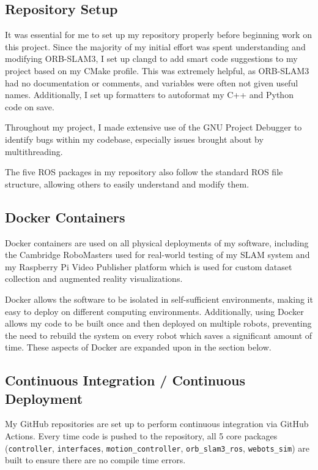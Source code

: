 \subsection{Repository Setup}
\label{sec:repository-setup}
It was essential for me to set up my repository properly before beginning work on this project. Since the majority of my initial effort was spent understanding and modifying ORB-SLAM3, I set up clangd to add smart code suggestions to my project based on my CMake profile. This was extremely helpful, as ORB-SLAM3 had no documentation or comments, and variables were often not given useful names. Additionally, I set up formatters to autoformat my C++ and Python code on save.

Throughout my project, I made extensive use of the GNU Project Debugger to identify bugs within my codebase, especially issues brought about by multithreading.

The five ROS packages in my repository also follow the standard ROS file structure, allowing others to easily understand and modify them.

\subsection{Docker Containers}
\label{sec:docker-containers}
Docker containers are used on all physical deployments of my software, including the Cambridge RoboMasters used for real-world testing of my SLAM system and my Raspberry Pi Video Publisher platform which is used for custom dataset collection and augmented reality visualizations.

Docker allows the software to be isolated in self-sufficient environments, making it easy to deploy on different computing environments. Additionally, using Docker allows my code to be built once and then deployed on multiple robots, preventing the need to rebuild the system on every robot which saves a significant amount of time. These aspects of Docker are expanded upon in the section below.

\subsection{Continuous Integration / Continuous Deployment}
\label{sec:cicd}
My GitHub repositories are set up to perform continuous integration via GitHub Actions. Every time code is pushed to the repository, all 5 core packages (\texttt{controller}, \texttt{interfaces}, \texttt{motion\_controller}, \texttt{orb\_slam3\_ros}, \texttt{webots\_sim}) are built to ensure there are no compile time errors.

